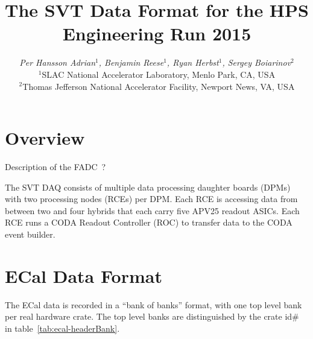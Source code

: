 \documentclass{desyproc}
\begin{document}
\title{The SVT Data Format for the HPS Engineering Run 2015 }

\author{{\slshape Per Hansson Adrian$^1$, Benjamin Reese$^1$, Ryan Herbst$^1$, Sergey Boiarinov$^2$}\\
$^1$SLAC National Accelerator Laboratory, Menlo Park, CA, USA\\
$^2$Thomas Jefferson National Accelerator Facility, Newport News, VA, USA}



\maketitle







\section{Overview}

Description of the FADC~\cite{fadc250}?

The SVT DAQ consists of multiple data processing daughter boards (DPMs) with two processing nodes (RCEs) per DPM. 
Each RCE is accessing data from between two and four hybrids that each carry five APV25 readout ASICs. Each RCE 
runs a CODA Readout Controller  (ROC) to transfer data to the CODA event builder. 

\section{ECal Data Format}
The ECal data is recorded in a ``bank of banks'' format, with one top level bank per real hardware crate.  The top level banks are distinguished by the crate id\# in table~\ref{tab:ecal-headerBank}.
\end{document}
